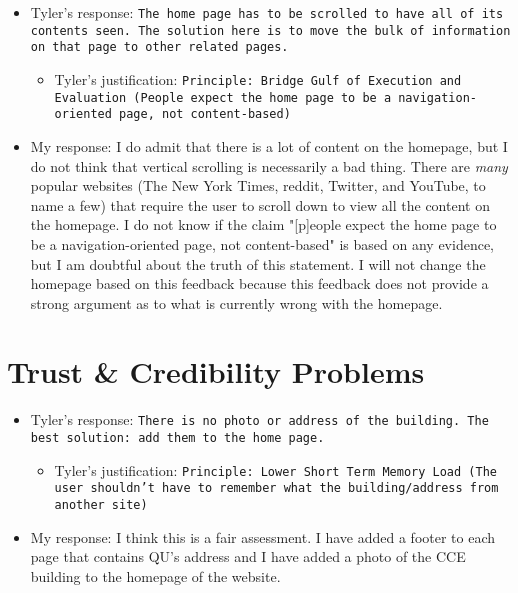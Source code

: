 \documentclass{article}
\begin{document}
\begin{itemize}
	\item Tyler's response: \texttt{The home page has to be scrolled to have all of its contents seen.  The solution here is to move the bulk of information on that page to other related pages.}
	\begin{itemize}
		\item Tyler's justification: \texttt{Principle: Bridge Gulf of Execution and Evaluation (People expect the home page to be a navigation-oriented page, not content-based)}
	\end{itemize}
	\item My response: I do admit that there is a lot of content on the homepage, but I do not think that vertical scrolling is necessarily a bad thing.  There are \emph{many} popular websites (The New York Times, reddit, Twitter, and YouTube, to name a few) that require the user to scroll down to view all the content on the homepage.  I do not know if the claim "[p]eople expect the home page to be a navigation-oriented page, not content-based" is based on any evidence, but I am doubtful about the truth of this statement.  I will not change the homepage based on this feedback because this feedback does not provide a strong argument as to what is currently wrong with the homepage.
\end{itemize}

\section{Trust \& Credibility Problems}
\begin{itemize}
	\item Tyler's response: \texttt{There is no photo or address of the building.  The best solution: add them to the home page.}
	\begin{itemize}
		\item Tyler's justification: \texttt{Principle: Lower Short Term Memory Load (The user shouldn’t have to remember what the building/address from another site)}
	\end{itemize}
	\item My response: I think this is a fair assessment.  I have added a footer to each page that contains QU's address and I have added a photo of the CCE building to the homepage of the website.
\end{itemize}
\end{document}
